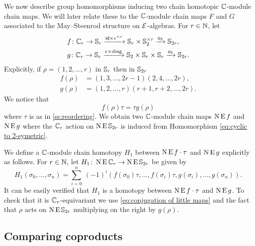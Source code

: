 We now describe group homomorphisms inducing two chain homotopic $\mathbb{C}$-module chain maps.
We will later relate these to the $\mathbb{C}$-module chain maps $F$ and $G$ associated to the May--Steenrod structure on $\mathcal{E}$-algebras.
For $r \in \mathbb{N}$, let
\[
\begin{split}
	&f \colon \mathbb{C}_r \to \mathbb{S}_r \xrightarrow{\mathsf{id} \times e^{\times r}} \mathbb{S}_r \times \mathbb{S}_2^{\times r} \xrightarrow{\bm{\circ}_{\mathbb{S}}} \mathbb{S}_{2r}, \\
	&g \colon \mathbb{C}_r \to \mathbb{S}_r \xrightarrow{e \times \mathrm{diag}} \mathbb{S}_2 \times \mathbb{S}_r \times \mathbb{S}_r \xrightarrow{\bm{\circ}_{\mathbb{S}}} \mathbb{S}_{2r}.
\end{split}
\]
Explicitly, if $\rho = (1,2,\dots,r)$ in $\mathbb{S}_r$ then in $\mathbb{S}_{2r}$
\begin{align*}
	f(\rho) &= (1,3,\dots,2r-1)(2,4,\dots,2r), \\
	g(\rho) &= (1,2,\dots,r)(r+1,r+2,\dots,2r).
\end{align*}
We notice that
\begin{equation}\label{eq:conjugation of little maps}
	f(\rho) \tau = \tau g(\rho)
\end{equation}
where $\tau$ is as in \cref{ss:reordering}.
We obtain two $\mathbb{C}$-module chain maps $\operatorname{N}\operatorname{E} f$ and $\operatorname{N}\operatorname{E} g$ where the $\mathbb{C}_r$ action on $\operatorname{N}\operatorname{E}\mathbb{S}_{2r}$ is induced from Homomorphism \eqref{eq:cyclic to 2-symetric}.

We define a $\mathbb{C}$-module chain homotopy $H_1$ between $\operatorname{N} \operatorname{E} f \cdot \tau$ and $\operatorname{N} \operatorname{E} g$
explicitly as follows.
For $r \in \mathbb{N}$, let $H_1 \colon \operatorname{N}\operatorname{E}\mathbb{C}_r \to \operatorname{N}\operatorname{E}\mathbb{S}_{2r}$ be given by
\[
H_1(\sigma_0,\dots,\sigma_n) =
\sum_{i=0}^n \ (-1)^i (f(\sigma_0) \tau, \dots, f(\sigma_i) \tau, g(\sigma_i), \dots, g(\sigma_n)).
\]
It can be easily verified that $H_1$ is a homotopy between $\operatorname{N} \operatorname{E} f \cdot \tau$ and $\operatorname{N} \operatorname{E} g$.
To check that it is $\mathbb{C}_r$-equivariant we use \cref{eq:conjugation of little maps} and the fact that $\rho$ acts on $\operatorname{N}\operatorname{E}\mathbb{S}_{2r}$ multiplying on the right by $g(\rho)$.

\subsection{Comparing coproducts} \label{ss:coproduct}

